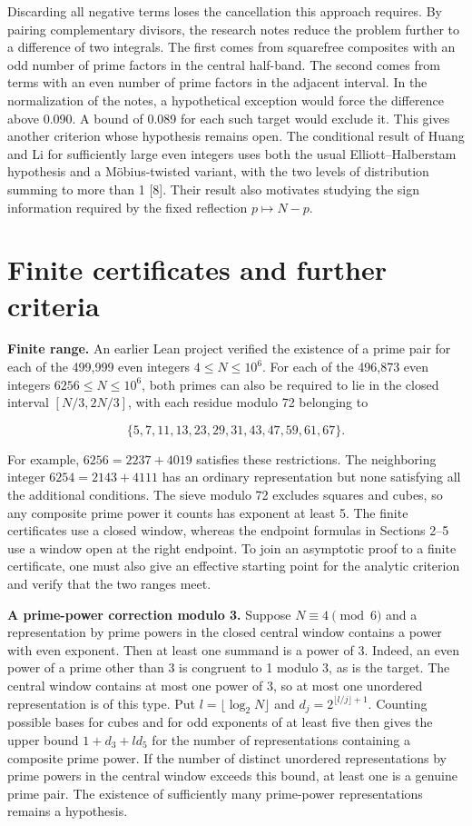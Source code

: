\documentclass[11pt,a4paper]{article}
\begin{document}
Discarding all negative terms loses the cancellation this approach requires. By pairing complementary divisors, the research notes reduce the problem further to a difference of two integrals. The first comes from squarefree composites with an odd number of prime factors in the central half-band. The second comes from terms with an even number of prime factors in the adjacent interval. In the normalization of the notes, a hypothetical exception would force the difference above 0.090. A bound of 0.089 for each such target would exclude it. This gives another criterion whose hypothesis remains open. The conditional result of Huang and Li for sufficiently large even integers uses both the usual Elliott--Halberstam hypothesis and a Möbius-twisted variant, with the two levels of distribution summing to more than 1 [8]. Their result also motivates studying the sign information required by the fixed reflection $p\mapsto N-p$.

\section{Finite certificates and further criteria}

\textbf{Finite range.} An earlier Lean project verified the existence of a prime pair for each of the 499,999 even integers $4\le N\le10^6$. For each of the 496,873 even integers $6256\le N\le10^6$, both primes can also be required to lie in the closed interval $[N/3,2N/3]$, with each residue modulo 72 belonging to

\[
\{5,7,11,13,23,29,31,43,47,59,61,67\}.
\]

For example, $6256=2237+4019$ satisfies these restrictions. The neighboring integer $6254=2143+4111$ has an ordinary representation but none satisfying all the additional conditions. The sieve modulo 72 excludes squares and cubes, so any composite prime power it counts has exponent at least 5. The finite certificates use a closed window, whereas the endpoint formulas in Sections 2--5 use a window open at the right endpoint. To join an asymptotic proof to a finite certificate, one must also give an effective starting point for the analytic criterion and verify that the two ranges meet.

\textbf{A prime-power correction modulo 3.} Suppose $N\equiv4\pmod6$ and a representation by prime powers in the closed central window contains a power with even exponent. Then at least one summand is a power of 3. Indeed, an even power of a prime other than 3 is congruent to 1 modulo 3, as is the target. The central window contains at most one power of 3, so at most one unordered representation is of this type. Put $l=\lfloor\log_2 N\rfloor$ and $d_j=2^{\lfloor l/j\rfloor+1}$. Counting possible bases for cubes and for odd exponents of at least five then gives the upper bound $1+d_3+l d_5$ for the number of representations containing a composite prime power. If the number of distinct unordered representations by prime powers in the central window exceeds this bound, at least one is a genuine prime pair. The existence of sufficiently many prime-power representations remains a hypothesis.
\end{document}
